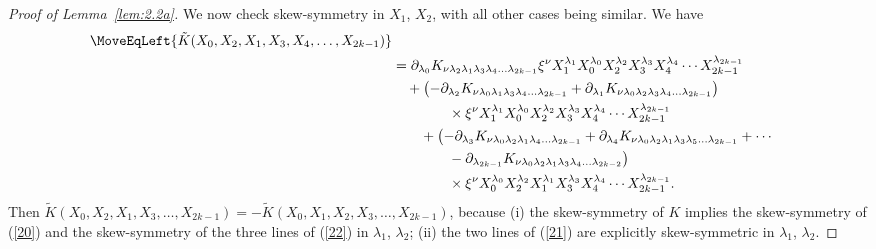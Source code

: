 \documentclass[10pt,a4paper]{amsart}
\numberwithin{equation}{section}
\theoremstyle{definition}
\begin{document}
\begin{proof}[Proof of Lemma~\ref{lem:2.2a}]
We now check skew-symmetry in $X_1$, $X_2$, with all other cases being similar. We have
\begin{align}
\MoveEqLeft{\tilde K(X_0,X_2, X_1, X_3, X_4, \dots,X_{2k-1}) }\nonumber\\
&= \partial_{\lambda_0} K_{\nu \lambda_2\lambda_1\lambda_3\lambda_4\dots\lambda_{2k-1}}
\xi^\nu X_1^{\lambda_1} X_0^{\lambda_0} X_2^{\lambda_2}X_3^{\lambda_3}X_4^{\lambda_4} \cdots X_{2k-1}^{\lambda_{2k-1}}\label{20}\\
&\quad +\bigl( - \partial_{\lambda_2} K_{\nu \lambda_0\lambda_1\lambda_3\lambda_4\dots\lambda_{2k-1}}
+ \partial_{\lambda_1} K_{\nu \lambda_0\lambda_2\lambda_3\lambda_4\dots\lambda_{2k-1}} \bigr)\nonumber\\
&\qquad \qquad \times
\xi^\nu X_1^{\lambda_1} X_0^{\lambda_0} X_2^{\lambda_2}X_3^{\lambda_3}X_4^{\lambda_4} \cdots X_{2k-1}^{\lambda_{2k-1}}\label{21}\\
&\qquad +\bigl(- \partial_{\lambda_3} K_{\nu \lambda_0\lambda_2\lambda_1\lambda_4\dots\lambda_{2k-1}}
+ \partial_{\lambda_4} K_{\nu \lambda_0\lambda_2\lambda_1\lambda_3\lambda_5\dots\lambda_{2k-1}}
+\cdots\nonumber\\
&\qquad\qquad - \partial_{\lambda_{2k-1}} K_{\nu \lambda_0\lambda_2\lambda_1\lambda_3\lambda_4
\dots \lambda_{2k-2}}\bigr)\nonumber\\
&\qquad \qquad \times\xi^\nu X_0^{\lambda_0} X_2^{\lambda_2}X_1^{\lambda_1}X_3^{\lambda_3}X_4^{\lambda_4}\cdots X_{2k-1}^{\lambda_{2k-1}}.\label{22}
\end{align}
Then $\tilde K(X_0,X_2, X_1, X_3, \dots, X_{2k-1}) = - \tilde K(X_0,X_1, X_2, X_3, \dots, X_{2k-1}) $, because
(i) the skew-symmetry of $K$ implies the skew-symmetry of (\ref{20}) and the skew-symmetry of the three lines of (\ref{22}) in $\lambda_1$, $\lambda_2$; (ii) the two lines of
(\ref{21}) are explicitly skew-symmetric in $\lambda_1$, $\lambda_2$.
\end{proof}
\end{document}
